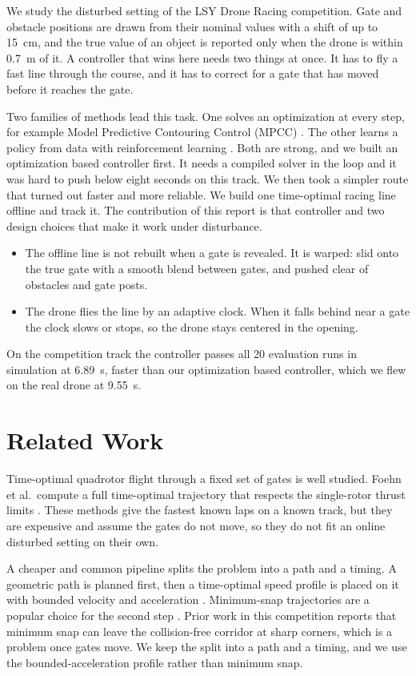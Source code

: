 \documentclass[conference]{IEEEtran}
\begin{document}
We study the disturbed setting of the LSY Drone Racing competition. Gate and obstacle positions are drawn from their nominal values with a shift of up to 15~cm, and the true value of an object is reported only when the drone is within 0.7~m of it. A controller that wins here needs two things at once. It has to fly a fast line through the course, and it has to correct for a gate that has moved before it reaches the gate.

Two families of methods lead this task. One solves an optimization at every step, for example Model Predictive Contouring Control (MPCC) \cite{mpcc}. The other learns a policy from data with reinforcement learning \cite{champion,songrl}. Both are strong, and we built an optimization based controller first. It needs a compiled solver in the loop and it was hard to push below eight seconds on this track. We then took a simpler route that turned out faster and more reliable. We build one time-optimal racing line offline and track it. The contribution of this report is that controller and two design choices that make it work under disturbance.
\begin{itemize}
\item The offline line is not rebuilt when a gate is revealed. It is warped: slid onto the true gate with a smooth blend between gates, and pushed clear of obstacles and gate posts.
\item The drone flies the line by an adaptive clock. When it falls behind near a gate the clock slows or stops, so the drone stays centered in the opening.
\end{itemize}
On the competition track the controller passes all 20 evaluation runs in simulation at 6.89~s, faster than our optimization based controller, which we flew on the real drone at 9.55~s.

\section{Related Work}
\label{sec:related}
Time-optimal quadrotor flight through a fixed set of gates is well studied. Foehn et al.\ compute a full time-optimal trajectory that respects the single-rotor thrust limits \cite{foehn}. These methods give the fastest known laps on a known track, but they are expensive and assume the gates do not move, so they do not fit an online disturbed setting on their own.

A cheaper and common pipeline splits the problem into a path and a timing. A geometric path is planned first, then a time-optimal speed profile is placed on it with bounded velocity and acceleration \cite{kunz,verscheure}. Minimum-snap trajectories are a popular choice for the second step \cite{minsnap}. Prior work in this competition reports that minimum snap can leave the collision-free corridor at sharp corners, which is a problem once gates move. We keep the split into a path and a timing, and we use the bounded-acceleration profile rather than minimum snap.
\end{document}
